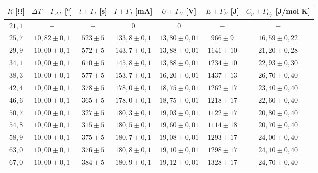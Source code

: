 \begin{table}
[H]
\begin{tabular}{ccccccc}

  \toprule
$R$ [$\si{\ohm}$] & $\Delta{T}\pm\Gamma_{\Delta{T}}$ [°] & $t \pm \Gamma_t$ [s] & $I \pm \Gamma_I$ [mA] & $U \pm \Gamma_U$ [V] & $E \pm \Gamma_E$ [J] & $C_p \pm \Gamma_{C_p} $ [J/mol K]\\

\midrule
$21,1$ & $-            $ & $ -       $ & $0            $ & $0             $ & $-$            & $-$              \\

$25,7$ & $10,82 \pm 0,1$ & $523 \pm 5$ & $133,8 \pm 0,1$ & $13,80 \pm 0,01$ & $ 966 \pm  9$  & $16,59 \pm 0,22$ \\

$29,9$ & $10,00 \pm 0,1$ & $572 \pm 5$ & $143,7 \pm 0,1$ & $13,88 \pm 0,01$ & $1141 \pm 10$  & $21,20 \pm 0,28$ \\
$34,1$ & $10,00 \pm 0,1$ & $610 \pm 5$ & $145,8 \pm 0,1$ & $13,88 \pm 0,01$ & $1234 \pm 10$  & $22,93 \pm 0,30$ \\
$38,3$ & $10,00 \pm 0,1$ & $577 \pm 5$ & $153,7 \pm 0,1$ & $16,20 \pm 0,01$ & $1437 \pm 13$  & $26,70 \pm 0,40$ \\

$42,4$ & $10,00 \pm 0,1$ & $378 \pm 5$ & $178,0 \pm 0,1$ & $18,75 \pm 0,01$ & $1262 \pm 17$  & $23,40 \pm 0,40$ \\

$46,6$ & $10,00 \pm 0,1$ & $365 \pm 5$ & $178,0 \pm 0,1$ & $18,75 \pm 0,01$ & $1218 \pm 17$  & $22,60 \pm 0,40$ \\

$50,7$ & $10,00 \pm 0,1$ & $327 \pm 5$ & $180,3 \pm 0,1$ & $19,03 \pm 0,01$ & $1122 \pm 17$  & $20,80 \pm 0,40$ \\

$54,8$ & $10,00 \pm 0,1$ & $315 \pm 5$ & $180,5 \pm 0,1$ & $19,60 \pm 0,01$ & $1114 \pm 18$  & $20,70 \pm 0,40$ \\

$58,9$ & $10,00 \pm 0,1$ & $375 \pm 5$ & $180,7 \pm 0,1$ & $19,08 \pm 0,01$ & $1293 \pm 17$  & $24,00 \pm 0,40$ \\

$63,0$ & $10,00 \pm 0,1$ & $376 \pm 5$ & $180,8 \pm 0,1$ & $19,10 \pm 0,01$ & $1298 \pm 17$  & $24,10 \pm 0,40$ \\

$67,0$ & $10,00 \pm 0,1$ & $384 \pm 5$ & $180,9 \pm 0,1$ & $19,12 \pm 0,01$ & $1328 \pm 17$  & $24,70 \pm 0,40$ \\


\end{tabular}
\end{table}
